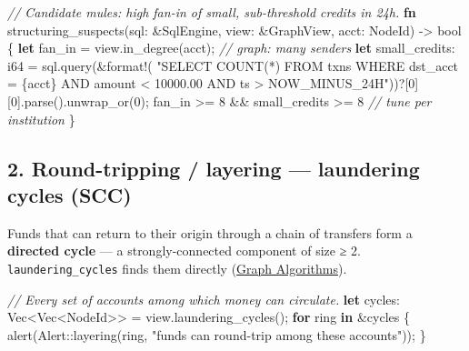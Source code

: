 \documentclass[
  11pt,
  openany]{book}
\newenvironment{Shaded}{}{}
\newcommand{\CommentTok}[1]{\textcolor[rgb]{0.38,0.63,0.69}{\textit{#1}}}
\newcommand{\ControlFlowTok}[1]{\textcolor[rgb]{0.00,0.44,0.13}{\textbf{#1}}}
\newcommand{\DataTypeTok}[1]{\textcolor[rgb]{0.56,0.13,0.00}{#1}}
\newcommand{\DecValTok}[1]{\textcolor[rgb]{0.25,0.63,0.44}{#1}}
\newcommand{\KeywordTok}[1]{\textcolor[rgb]{0.00,0.44,0.13}{\textbf{#1}}}
\newcommand{\NormalTok}[1]{#1}
\newcommand{\OperatorTok}[1]{\textcolor[rgb]{0.40,0.40,0.40}{#1}}
\newcommand{\PreprocessorTok}[1]{\textcolor[rgb]{0.74,0.48,0.00}{#1}}
\newcommand{\StringTok}[1]{\textcolor[rgb]{0.25,0.44,0.63}{#1}}
\begin{document}
\begin{Shaded}
\begin{Highlighting}[]
\CommentTok{// Candidate mules: high fan{-}in of small, sub{-}threshold credits in 24h.}
\KeywordTok{fn}\NormalTok{ structuring\_suspects(sql}\OperatorTok{:} \OperatorTok{\&}\NormalTok{SqlEngine}\OperatorTok{,}\NormalTok{ view}\OperatorTok{:} \OperatorTok{\&}\NormalTok{GraphView}\OperatorTok{,}\NormalTok{ acct}\OperatorTok{:}\NormalTok{ NodeId) }\OperatorTok{{-}\textgreater{}} \DataTypeTok{bool} \OperatorTok{\{}
    \KeywordTok{let}\NormalTok{ fan\_in }\OperatorTok{=}\NormalTok{ view}\OperatorTok{.}\NormalTok{in\_degree(acct)}\OperatorTok{;}                 \CommentTok{// graph: many senders}
    \KeywordTok{let}\NormalTok{ small\_credits}\OperatorTok{:} \DataTypeTok{i64} \OperatorTok{=}\NormalTok{ sql}\OperatorTok{.}\NormalTok{query(}\OperatorTok{\&}\PreprocessorTok{format!}\NormalTok{(}
        \StringTok{"SELECT COUNT(*) FROM txns}
\StringTok{         WHERE dst\_acct = \{acct\} AND amount \textless{} 10000.00}
\StringTok{           AND ts \textgreater{} NOW\_MINUS\_24H"}\NormalTok{))}\OperatorTok{?}\NormalTok{[}\DecValTok{0}\NormalTok{][}\DecValTok{0}\NormalTok{]}\OperatorTok{.}\NormalTok{parse()}\OperatorTok{.}\NormalTok{unwrap\_or(}\DecValTok{0}\NormalTok{)}\OperatorTok{;}
\NormalTok{    fan\_in }\OperatorTok{\textgreater{}=} \DecValTok{8} \OperatorTok{\&\&}\NormalTok{ small\_credits }\OperatorTok{\textgreater{}=} \DecValTok{8}                  \CommentTok{// tune per institution}
\OperatorTok{\}}
\end{Highlighting}
\end{Shaded}

\subsection{2. Round-tripping / layering --- laundering cycles
(SCC)}\label{round-tripping-layering-laundering-cycles-scc}

Funds that can return to their origin through a chain of transfers form
a \textbf{directed cycle} --- a strongly-connected component of size ≥
2. \texttt{laundering\_cycles} finds them directly
(\href{../graph/algorithms.md}{Graph Algorithms}).

\begin{Shaded}
\begin{Highlighting}[]
\CommentTok{// Every set of accounts among which money can circulate.}
\KeywordTok{let}\NormalTok{ cycles}\OperatorTok{:} \DataTypeTok{Vec}\OperatorTok{\textless{}}\DataTypeTok{Vec}\OperatorTok{\textless{}}\NormalTok{NodeId}\OperatorTok{\textgreater{}\textgreater{}} \OperatorTok{=}\NormalTok{ view}\OperatorTok{.}\NormalTok{laundering\_cycles()}\OperatorTok{;}
\ControlFlowTok{for}\NormalTok{ ring }\KeywordTok{in} \OperatorTok{\&}\NormalTok{cycles }\OperatorTok{\{}
\NormalTok{    alert(}\PreprocessorTok{Alert::}\NormalTok{layering(ring}\OperatorTok{,} \StringTok{"funds can round{-}trip among these accounts"}\NormalTok{))}\OperatorTok{;}
\OperatorTok{\}}
\end{Highlighting}
\end{Shaded}
\end{document}
